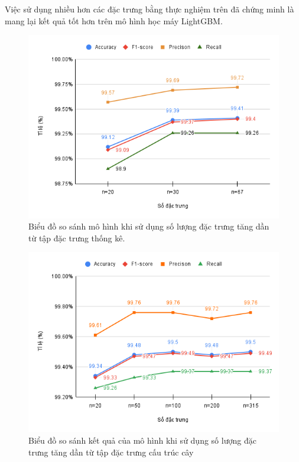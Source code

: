\documentclass[./../main.tex]{subfiles}
\begin{document}
Việc sử dụng nhiều hơn các đặc trưng bằng thực nghiệm trên đã chứng minh là mang lại kết quả tốt hơn trên mô hình học máy LightGBM.

\begin{figure}[H]
	\centering
	\includegraphics[width=0.8\linewidth]{./images/exp1_top_all_general_feat.png}
	\caption{Biểu đồ so sánh mô hình khi sử dụng số lượng đặc trưng tăng dần từ tập đặc trưng thống kê.}
	\label{fig:exp1_top_all_general_feat}
\end{figure}

\begin{figure}[H]
	\centering
	\includegraphics[width=0.8\linewidth]{./images/exp1_top_all_structual_path.png}
	\caption{Biểu đồ so sánh kết quả của mô hình khi sử dụng số lượng đặc trưng tăng dần từ tập đặc trưng cấu trúc cây}
	\label{fig:exp1_top_all_structual_path}
\end{figure}
\end{document}
